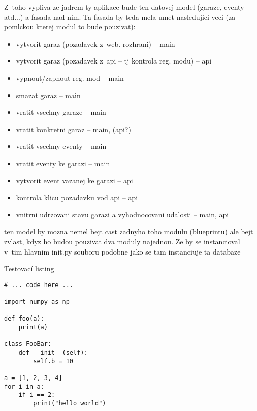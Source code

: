 Z~toho vypliva ze jadrem ty aplikace bude ten datovej model (garaze, eventy atd...) a fasada nad nim. Ta fasada by teda mela umet nasledujici veci (za pomlckou kterej modul to bude pouzivat):

\begin{itemize}
    \item vytvorit garaz (pozadavek z~web. rozhrani) -- main
    \item vytvorit garaz (pozadavek z~api -- tj kontrola reg. modu) -- api
    \item vypnout/zapnout reg. mod -- main
    \item smazat garaz -- main
    \item vratit vsechny garaze -- main
    \item vratit konkretni garaz -- main, (api?)
    \item vratit vsechny eventy -- main
    \item vratit eventy ke garazi -- main
    \item vytvorit event vazanej ke garazi -- api
    \item kontrola klicu pozadavku vod api -- api
    \item vnitrni udrzovani stavu garazi a vyhodnocovani udalosti -- main, api
\end{itemize}

ten model by mozna nemel bejt cast zadnyho toho modulu (blueprintu) ale bejt zvlast, kdyz ho budou pouzivat dva moduly najednou. Ze by se instancioval v~tim hlavnim init.py souboru podobne jako se tam instanciuje ta databaze


\begin{listing}[htbp]
\caption{\label{code:foo} Testovací listing}
\begin{verbatim}
# ... code here ...

import numpy as np

def foo(a):
    print(a)

class FooBar:
    def __init__(self):
        self.b = 10

a = [1, 2, 3, 4]
for i in a:
    if i == 2:
        print("hello world")
\end{verbatim}
\end{listing}